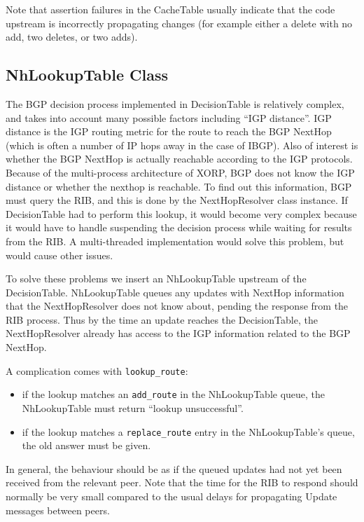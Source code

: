 \documentclass[11pt]{article}
\begin{document}
Note that assertion failures in the CacheTable usually indicate that
the code upstream is incorrectly propagating changes (for example
either a delete with no add, two deletes, or two adds).

\subsection{NhLookupTable Class}

The BGP decision process implemented in DecisionTable is relatively
complex, and takes into account many possible factors including ``IGP
distance''.  IGP distance is the IGP routing metric for the route to
reach the BGP NextHop (which is often a number of IP hops away in the
case of IBGP).  Also of interest is whether the BGP NextHop is
actually reachable according to the IGP protocols.  Because of the
multi-process architecture of XORP, BGP does not know the IGP distance
or whether the nexthop is reachable.  To find out this information,
BGP must query the RIB, and this is done by the NextHopResolver class
instance.  If DecisionTable had to perform this lookup, it would
become very complex because it would have to handle suspending the
decision process while waiting for results from the RIB.  A
multi-threaded implementation would solve this problem, but would
cause other issues.

To solve these problems we insert an NhLookupTable upstream of the
DecisionTable.  NhLookupTable queues any updates with NextHop
information that the NextHopResolver does not know about, pending the
response from the RIB process.  Thus by the time an update reaches the
DecisionTable, the NextHopResolver already has access to the IGP
information related to the BGP NextHop.

A complication comes with {\tt lookup\_route}:
\begin{itemize}
\item if the lookup matches an {\tt add\_route} in the NhLookupTable queue,
the NhLookupTable must return ``lookup unsuccessful''.
\item if the lookup matches a
{\tt replace\_route} entry in the NhLookupTable's queue, the old
answer must be given.
\end{itemize}
In general, the behaviour should be as if the queued updates had not
yet been received from the relevant peer.  Note that the time for the
RIB to respond should normally be very small compared to the usual
delays for propagating Update messages between peers.
\end{document}
